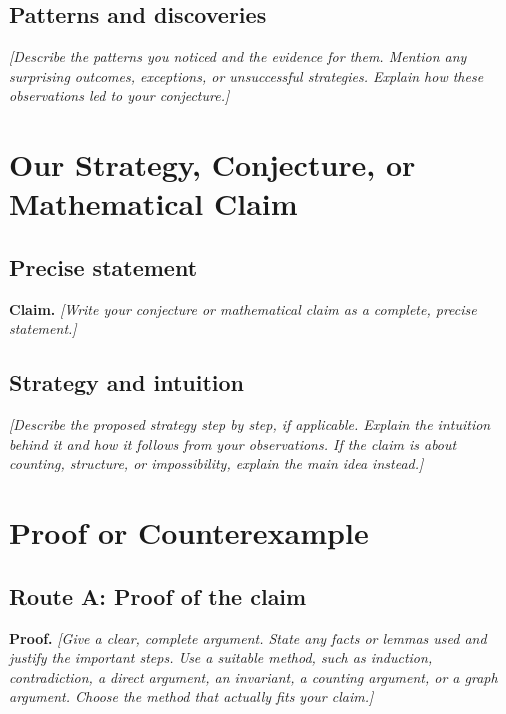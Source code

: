 \documentclass[11pt,a4paper]{article}
\newif\ifshowguidance
\newcommand{\placeholder}[1]{\textit{[#1]}}
\newcommand{\guidance}[1]{%
  \ifshowguidance
    \par\smallskip\noindent
    \begingroup\setlength{\fboxsep}{8pt}%
    \colorbox{guidebg}{\parbox{\dimexpr\linewidth-2\fboxsep\relax}{%
      \small\color{guidetext}#1}}\endgroup\par\smallskip
  \fi}
\begin{document}
\subsection{Patterns and discoveries}
\placeholder{Describe the patterns you noticed and the evidence for them.
Mention any surprising outcomes, exceptions, or unsuccessful strategies.
Explain how these observations led to your conjecture.}

\section{Our Strategy, Conjecture, or Mathematical Claim}

\subsection{Precise statement}
\guidance{State the range of cases and all conditions under which your claim is
meant to hold. For a winning strategy, specify which player can use it, from
which positions, and whether it must work against every legal opponent move.
Repeated wins alone do not establish a guaranteed winning strategy.}

\textbf{Claim.} \placeholder{Write your conjecture or mathematical claim as a
complete, precise statement.}

\subsection{Strategy and intuition}
\placeholder{Describe the proposed strategy step by step, if applicable.
Explain the intuition behind it and how it follows from your observations.
If the claim is about counting, structure, or impossibility, explain the main
idea instead.}

\newpage
\section{Proof or Counterexample}
\guidance{Complete the appropriate route below and remove the unused route.
Experiments may suggest a claim; a proof must establish it for every case
covered by the statement. A valid counterexample must satisfy the assumptions
and contradict the claimed conclusion. Support your main claim with a proof
or disprove it with a counterexample.}

\subsection*{Route A: Proof of the claim}
\textbf{Proof.}
\placeholder{Give a clear, complete argument. State any facts or lemmas used
and justify the important steps. Use a suitable method, such as induction,
contradiction, a direct argument, an invariant, a counting argument, or a graph
argument. Choose the method that actually fits your claim.}
\end{document}
